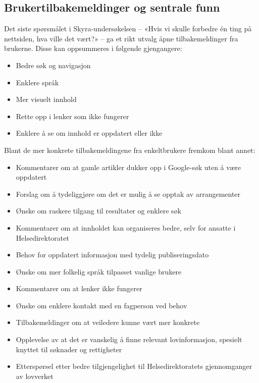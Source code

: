 \subsection{Brukertilbakemeldinger og sentrale funn}
\label{sec:brukertilbakemeldinger}

Det siste spørsmålet i Skyra-undersøkelsen – «Hvis vi skulle forbedre én ting på nettsiden, hva ville det vært?» – ga et rikt utvalg åpne tilbakemeldinger fra brukerne. Disse kan oppsummeres i følgende gjengangere:

\begin{itemize}
    \item Bedre søk og navigasjon
    \item Enklere språk
    \item Mer visuelt innhold
    \item Rette opp i lenker som ikke fungerer
    \item Enklere å se om innhold er oppdatert eller ikke
\end{itemize}

Blant de mer konkrete tilbakemeldingene fra enkeltbrukere fremkom blant annet:

\begin{itemize}
    \item Kommentarer om at gamle artikler dukker opp i Google-søk uten å være oppdatert
    \item Forslag om å tydeliggjøre om det er mulig å se opptak av arrangementer
    \item Ønske om raskere tilgang til resultater og enklere søk
    \item Kommentarer om at innholdet kan organiseres bedre, selv for ansatte i Helsedirektoratet
    \item Behov for oppdatert informasjon med tydelig publiseringsdato
    \item Ønske om mer folkelig språk tilpasset vanlige brukere
    \item Kommentarer om at lenker ikke fungerer
    \item Ønske om enklere kontakt med en fagperson ved behov
    \item Tilbakemeldinger om at veiledere kunne vært mer konkrete
    \item Opplevelse av at det er vanskelig å finne relevant lovinformasjon, spesielt knyttet til søknader og rettigheter
    \item Etterspørsel etter bedre tilgjengelighet til Helsedirektoratets gjennomganger av lovverket
\end{itemize}

